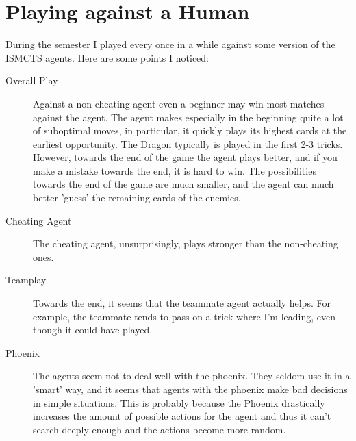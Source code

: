 \section{Playing against a Human}
During the semester I played every once in a while against some version of the ISMCTS agents. Here are some points I noticed:
\begin{description}
    \item[Overall Play] Against a non-cheating agent even a beginner may win most matches against the agent. The agent makes especially in the beginning quite a lot of suboptimal moves, in particular, it quickly plays its highest cards at the earliest opportunity. The Dragon typically is played in the first 2-3 tricks. However, towards the end of the game the agent plays better, and if you make a mistake towards the end, it is hard to win.
    The possibilities towards the end of the game are much smaller, and the agent can much better 'guess' the remaining cards of the enemies.
    \item[Cheating Agent] The cheating agent, unsurprisingly, plays stronger than the non-cheating ones.
    \item[Teamplay] Towards the end, it seems that the teammate agent actually helps. For example, the teammate tends to pass on a trick where I'm leading, even though it could have played.
    \item[Phoenix] The agents seem not to deal well with the phoenix. They seldom use it in a 'smart' way, and it seems that agents with the phoenix make bad decisions in simple situations. This is probably because the Phoenix drastically increases the amount of possible actions for the agent and thus it can't search deeply enough and the actions become more random.
\end{description}

